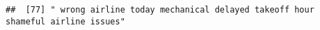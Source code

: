 \documentclass[
]{article}
\begin{document}
\begin{verbatim}
##  [77] " wrong airline today mechanical delayed takeoff hour shameful airline issues"                                                                                                                                                                                                                                                                                                                                                                                                                                                                                                                                                                                                                                                                                                                                                                                                                                                                                                                                                                                                                                                                                                                                                                                                                                                                                                                                                                                                                                                                                                                                                                                                                                                                                                                  

\end{verbatim}
\end{document}
